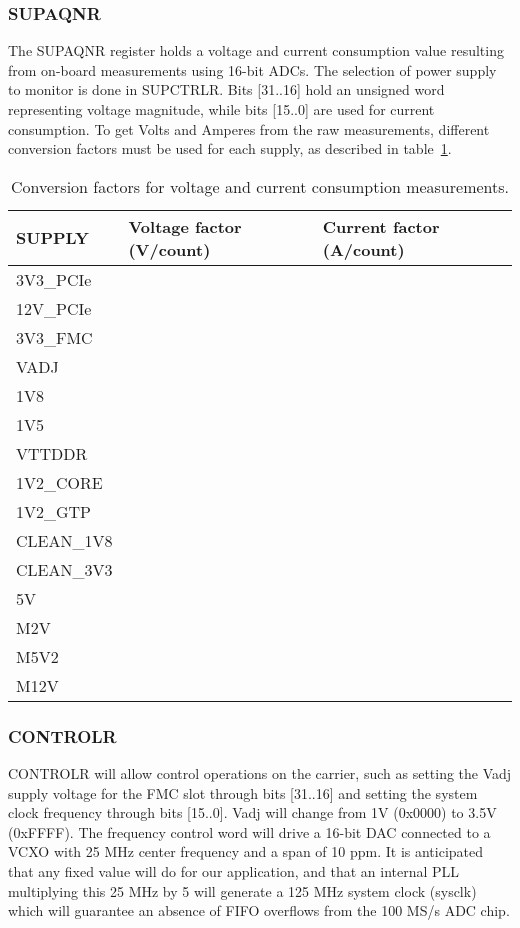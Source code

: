\documentclass{article}
\begin{document}
\subsubsection{SUPAQNR}
The SUPAQNR register holds a voltage and current consumption value resulting from on-board measurements using 16-bit ADCs. The selection of power supply to monitor is done in SUPCTRLR. Bits [31..16] hold an unsigned word representing voltage magnitude, while bits [15..0] are used for current consumption. To get Volts and Amperes from the raw measurements, different conversion factors must be used for each supply, as described in table~\ref{tab:conv_fact}.

\begin{table}[htbp]
  \centering
  \begin{tabularx}{\textwidth}{|X|l|l|}
    \hline
    \textbf{SUPPLY} & \textbf{Voltage factor (V/count)} & \textbf{Current factor (A/count)} \\
    \hline
    \hline
    3V3\_PCIe & & \\
    \hline
    12V\_PCIe & & \\
    \hline
    3V3\_FMC & & \\
    \hline
    VADJ & & \\
    \hline
    1V8 & & \\
    \hline
    1V5 & & \\
    \hline
    VTTDDR & & \\
    \hline
    1V2\_CORE & & \\
    \hline
    1V2\_GTP & & \\
    \hline
    CLEAN\_1V8 & & \\
    \hline
    CLEAN\_3V3 & & \\
    \hline
    5V & & \\
    \hline
    M2V & & \\
    \hline
    M5V2 & & \\
    \hline
    M12V & & \\
    \hline
  \end{tabularx}
  \caption{Conversion factors for voltage and current consumption measurements.}
  \label{tab:conv_fact}
\end{table}

\subsubsection{CONTROLR}
CONTROLR will allow control operations on the carrier, such as setting the Vadj supply voltage for the FMC slot through bits [31..16] and setting the system clock frequency through bits [15..0]. Vadj will change from 1V (0x0000) to 3.5V (0xFFFF). The frequency control word will drive a 16-bit DAC connected to a VCXO with 25 MHz center frequency and a span of 10 ppm. It is anticipated that any fixed value will do for our application, and that an internal PLL multiplying this 25 MHz by 5 will generate a 125 MHz system clock (sysclk) which will guarantee an absence of FIFO overflows from the 100 MS/s ADC chip.
\end{document}
